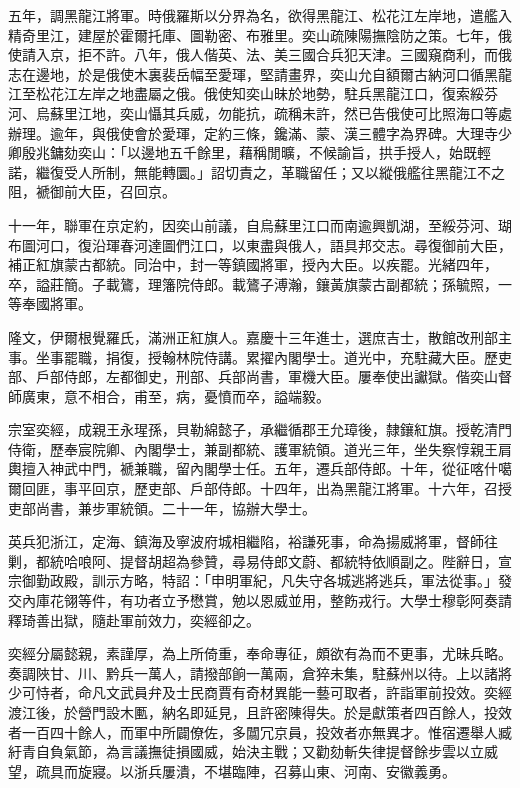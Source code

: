 \begin{pinyinscope}
五年，調黑龍江將軍。時俄羅斯以分界為名，欲得黑龍江、松花江左岸地，遣艦入精奇里江，建屋於霍爾托庫、圖勒密、布雅里。奕山疏陳陽撫陰防之策。七年，俄使請入京，拒不許。八年，俄人偕英、法、美三國合兵犯天津。三國窺商利，而俄志在邊地，於是俄使木裏裴岳幅至愛琿，堅請畫界，奕山允自額爾古納河口循黑龍江至松花江左岸之地盡屬之俄。俄使知奕山昧於地勢，駐兵黑龍江口，復索綏芬河、烏蘇里江地，奕山懾其兵威，勿能抗，疏稱未許，然已告俄使可比照海口等處辦理。逾年，與俄使會於愛琿，定約三條，鑱滿、蒙、漢三體字為界碑。大理寺少卿殷兆鏞劾奕山：「以邊地五千餘里，藉稱閒曠，不候諭旨，拱手授人，始既輕諾，繼復受人所制，無能轉圜。」詔切責之，革職留任；又以縱俄艦往黑龍江不之阻，褫御前大臣，召回京。

十一年，聯軍在京定約，因奕山前議，自烏蘇里江口而南逾興凱湖，至綏芬河、瑚布圖河口，復沿琿春河達圖們江口，以東盡與俄人，語具邦交志。尋復御前大臣，補正紅旗蒙古都統。同治中，封一等鎮國將軍，授內大臣。以疾罷。光緒四年，卒，謚莊簡。子載鷟，理籓院侍郎。載鷟子溥瀚，鑲黃旗蒙古副都統；孫毓照，一等奉國將軍。

隆文，伊爾根覺羅氏，滿洲正紅旗人。嘉慶十三年進士，選庶吉士，散館改刑部主事。坐事罷職，捐復，授翰林院侍講。累擢內閣學士。道光中，充駐藏大臣。歷吏部、戶部侍郎，左都御史，刑部、兵部尚書，軍機大臣。屢奉使出讞獄。偕奕山督師廣東，意不相合，甫至，病，憂憤而卒，謚端毅。

宗室奕經，成親王永瑆孫，貝勒綿懿子，承繼循郡王允璋後，隸鑲紅旗。授乾清門侍衛，歷奉宸院卿、內閣學士，兼副都統、護軍統領。道光三年，坐失察惇親王肩輿擅入神武中門，褫兼職，留內閣學士任。五年，遷兵部侍郎。十年，從征喀什噶爾回匪，事平回京，歷吏部、戶部侍郎。十四年，出為黑龍江將軍。十六年，召授吏部尚書，兼步軍統領。二十一年，協辦大學士。

英兵犯浙江，定海、鎮海及寧波府城相繼陷，裕謙死事，命為揚威將軍，督師往剿，都統哈哴阿、提督胡超為參贊，尋易侍郎文蔚、都統特依順副之。陛辭日，宣宗御勤政殿，訓示方略，特詔：「申明軍紀，凡失守各城逃將逃兵，軍法從事。」發交內庫花翎等件，有功者立予懋賞，勉以恩威並用，整飭戎行。大學士穆彰阿奏請釋琦善出獄，隨赴軍前效力，奕經卻之。

奕經分屬懿親，素謹厚，為上所倚重，奉命專征，頗欲有為而不更事，尤昧兵略。奏調陜甘、川、黔兵一萬人，請撥部餉一萬兩，倉猝未集，駐蘇州以待。上以諸將少可恃者，命凡文武員弁及士民商賈有奇材異能一藝可取者，許詣軍前投效。奕經渡江後，於營門設木匭，納名即延見，且許密陳得失。於是獻策者四百餘人，投效者一百四十餘人，而軍中所闢僚佐，多闒冗京員，投效者亦無異才。惟宿遷舉人臧紆青自負氣節，為言議撫徒損國威，始決主戰；又勸劾斬失律提督餘步雲以立威望，疏具而旋寢。以浙兵屢潰，不堪臨陣，召募山東、河南、安徽義勇。


\end{pinyinscope}
